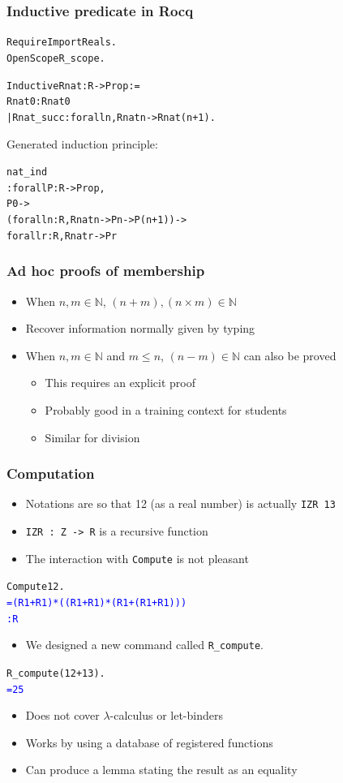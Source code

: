 \documentclass[compress]{beamer}
\begin{document}
\begin{frame}[fragile]
\frametitle{Inductive predicate in Rocq}
\begin{alltt}
Require Import Reals.
Open Scope R_scope.

Inductive Rnat : R -> Prop :=
  Rnat0 : Rnat 0
| Rnat_succ : forall n, Rnat n -> Rnat (n + 1).
\end{alltt}
Generated induction principle:
\begin{alltt}
nat_ind
     : forall P : R -> Prop,
       P 0 ->
       (forall n : R, Rnat n -> P n -> P (n + 1)) ->
       forall r : R, Rnat r -> P r
\end{alltt}
\end{frame}
\begin{frame}
\frametitle{Ad hoc proofs of membership}
\begin{itemize}
\item When \(n, m \in {\mathbb N}\), \((n + m), (n \times m) \in {\mathbb N}\)
\item Recover information normally given by typing
\item When \(n, m \in {\mathbb N}\) and \(m \leq n\), \((n - m) \in {\mathbb N}\) can
also be proved
\begin{itemize}
\item This requires an explicit proof
\item Probably good in a training context for students
\item Similar for division
\end{itemize}
\end{itemize}
\end{frame}
\begin{frame}[fragile]
\frametitle{Computation}
\begin{itemize}
\item Notations are so that 12 (as a real number) is actually {\tt IZR 13}
\item {\tt IZR~:~Z -> R} is a recursive function
\item The interaction with {\tt Compute} is not pleasant
\end{itemize}
\begin{alltt}
Compute 12.
\textcolor{blue}{ = (R1 + R1) * ((R1 + R1) * (R1 + (R1 + R1)))
     : R}
\end{alltt}
\begin{itemize}
\item We designed a new command called {\tt R\_compute}.
\end{itemize}
\begin{alltt}
R_compute (12 + 13).
\textcolor{blue}{ = 25}
\end{alltt}
\begin{itemize}
\item Does not cover \(\lambda\)-calculus or let-binders
\item Works by using a database of registered functions
\item Can produce a lemma stating the result as an equality
\end{itemize}
\end{frame}
\end{document}
